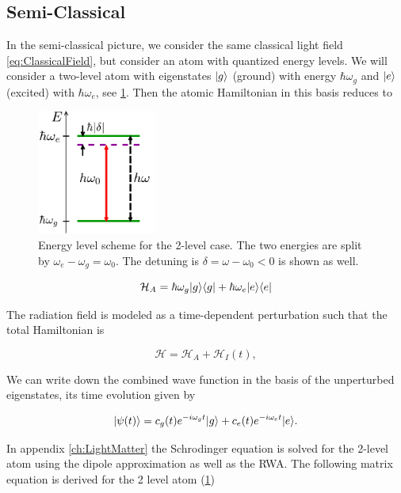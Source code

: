 \subsection{Semi-Classical}

In the semi-classical picture, we consider the same classical light field \cref{eq:ClassicalField}, but consider an atom with quantized energy levels. We will consider a two-level atom with eigenstates $\lvert g\rangle$ (ground) with energy $\hbar \omega_g$ and $\lvert e\rangle$ (excited) with $\hbar \omega_e$, see \cref{fig:2LevelAtom}. Then the atomic Hamiltonian in this basis reduces to \cite{Loudon2000}

\begin{figure}
	\centering
	\includegraphics[height=4.1cm]{figures/2LevelAtom.pdf}
	\caption{Energy level scheme for the 2-level case. The two energies are split by $\omega_e - \omega_g = \omega_0$. The detuning is $\delta = \omega-\omega_0<0$ is shown as well.}
	\label{fig:2LevelAtom}
\end{figure}

\begin{equation}\label{eq:AtomHamiltonianMain}
	\mathcal{H}_A = \hbar \omega_g \lvert g\rangle\langle g\rvert + \hbar \omega_e \lvert e\rangle\langle e\rvert
\end{equation}

The radiation field is modeled as a time-dependent perturbation such that the total Hamiltonian is \cite{Leeuwen2017}

\begin{equation}\label{eq:PerturbationMain}
	\mathcal{H} = \mathcal{H}_A + \mathcal{H}_{I}(t),
\end{equation}

We can write down the combined wave function in the basis of the unperturbed eigenstates, its time evolution given by

\begin{equation}\label{eq:TwoLevelMain}
	\lvert\psi(t)\rangle = c_g(t) e^{-i \omega_g t} \lvert g\rangle + c_e(t) e^{-i \omega_e t} \lvert e\rangle.
\end{equation}

In appendix \ref{ch:LightMatter} the Schrodinger equation is solved for the 2-level atom using the dipole approximation as well as the \acf*{RWA}. The following matrix equation is derived for the 2 level atom (\cref{fig:2LevelAtom}) \cite{Foot2005}

